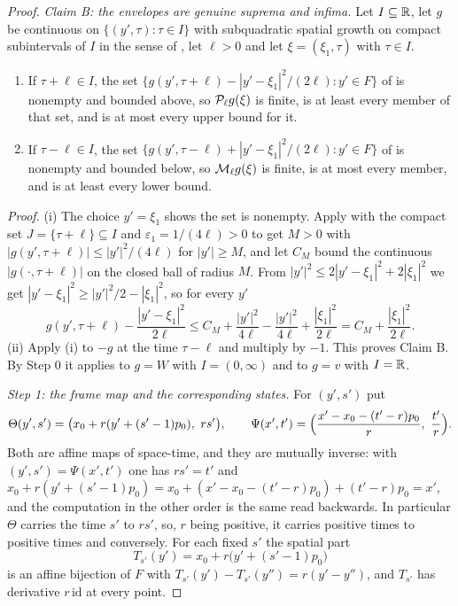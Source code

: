 \begin{proof}
\emph{Claim B: the envelopes are genuine suprema and infima.}
Let $I\subseteq\mathbb{R}$, let $g$ be continuous on $\{(y',\tau):\tau\in I\}$ with
subquadratic spatial growth on compact subintervals of $I$ in the sense of
, let $\ell>0$ and let $\xi=(\xi_1,\tau)$ with
$\tau\in I$.
\begin{enumerate}
\item[(i)] If $\tau+\ell\in I$, the set
$\{g(y',\tau+\ell)-|y'-\xi_1|^2/(2\ell):y'\in F\}$ of  is
nonempty and bounded above, so $\mathcal{P}_\ell g(\xi)$ is finite, is at least every
member of that set, and is at most every upper bound for it.
\item[(ii)] If $\tau-\ell\in I$, the set
$\{g(y',\tau-\ell)+|y'-\xi_1|^2/(2\ell):y'\in F\}$ of  is
nonempty and bounded below, so $\mathcal{M}_\ell g(\xi)$ is finite, is at most every
member, and is at least every lower bound.
\end{enumerate}
\emph{Proof.} (i) The choice $y'=\xi_1$ shows the set is nonempty. Apply
 with the compact set $J=\{\tau+\ell\}\subseteq I$
and $\varepsilon_1=1/(4\ell)>0$ to get $M>0$ with
$|g(y',\tau+\ell)|\le|y'|^2/(4\ell)$ for $|y'|\ge M$, and let $C_M$ bound the
continuous $|g(\cdot,\tau+\ell)|$ on the closed ball of radius $M$. From
$|y'|^2\le2|y'-\xi_1|^2+2|\xi_1|^2$ we get
$|y'-\xi_1|^2\ge|y'|^2/2-|\xi_1|^2$, so for every $y'$
\[
  g(y',\tau+\ell)-\frac{|y'-\xi_1|^2}{2\ell}
   \le C_M+\frac{|y'|^2}{4\ell}-\frac{|y'|^2}{4\ell}
       +\frac{|\xi_1|^2}{2\ell}
   =C_M+\frac{|\xi_1|^2}{2\ell}.
\]
(ii) Apply (i) to $-g$ at the time $\tau-\ell$ and multiply by $-1$. This
proves Claim B. By Step 0 it applies to $g=W$ with $I=(0,\infty)$ and to $g=v$
with $I=\mathbb{R}$.

\emph{Step 1: the frame map and the corresponding states.}
For $(y',s')$ put
\[
  \Theta(y',s')=\bigl(x_0+r(y'+(s'-1)p_0),\ rs'\bigr),\qquad
  \Psi(x',t')=\Bigl(\frac{x'-x_0-(t'-r)p_0}{r},\ \frac{t'}{r}\Bigr).
\]
Both are affine maps of space-time, and they are mutually inverse: with
$(y',s')=\Psi(x',t')$ one has $rs'=t'$ and
$x_0+r(y'+(s'-1)p_0)=x_0+(x'-x_0-(t'-r)p_0)+(t'-r)p_0=x'$, and the computation
in the other order is the same read backwards. In particular $\Theta$ carries
the time $s'$ to $rs'$, so, $r$ being positive, it carries positive times to
positive times and conversely. For each fixed $s'$ the spatial part
\[
  T_{s'}(y')=x_0+r\bigl(y'+(s'-1)p_0\bigr)
\]
is an affine bijection of $F$ with $T_{s'}(y')-T_{s'}(y'')=r(y'-y'')$, and
$T_{s'}$ has derivative $r\,\mathrm{id}$ at every point.


\end{proof}
